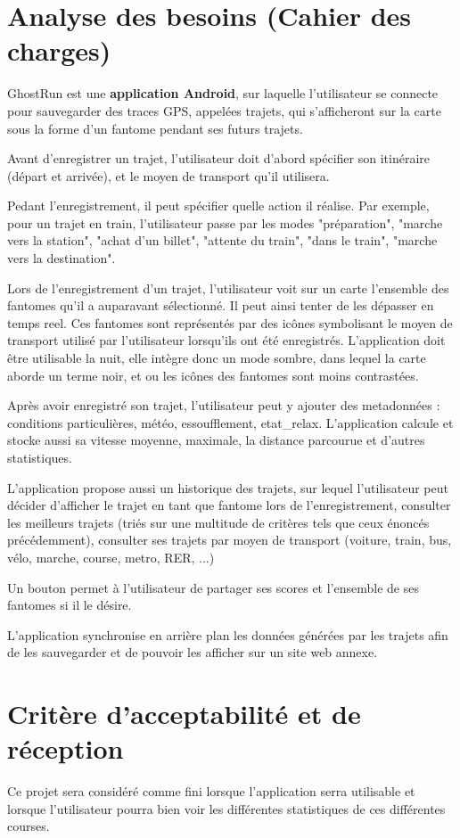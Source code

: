 \chapter{Analyse des besoins (Cahier des charges)}

GhostRun est une \textbf{application Android}, sur laquelle l'utilisateur se connecte pour sauvegarder des traces GPS, appelées trajets, qui s'afficheront sur la carte sous la forme d'un \gls{fantome} pendant ses futurs trajets.

Avant d'enregistrer un trajet, l'utilisateur doit d'abord spécifier son itinéraire (départ et arrivée), et le moyen de transport qu'il utilisera. 

Pedant l'enregistrement, il peut spécifier quelle action il réalise. Par exemple, pour un trajet en train, l'utilisateur passe par les modes "préparation", "marche vers la station", "achat d'un billet", "attente du train", "dans le train", "marche vers la destination".

Lors de l'enregistrement d'un trajet, l'utilisateur voit sur un carte l'ensemble des \glspl{fantome} qu'il a auparavant sélectionné. Il peut ainsi tenter de les dépasser en temps reel. Ces \glspl{fantome} sont représentés par des icônes symbolisant le moyen de transport utilisé par l'utilisateur lorsqu'ils ont été enregistrés. L'application doit être utilisable la nuit, elle intègre donc un mode sombre, dans lequel la carte aborde un terme noir, et ou les icônes des \glspl{fantome} sont moins contrastées.

Après avoir enregistré son trajet, l'utilisateur peut y ajouter des metadonnées : conditions particulières, météo, essoufflement, \gls{etat_relax}. L'application calcule et stocke aussi sa vitesse moyenne, maximale, la distance parcourue et d'autres statistiques.

L'application propose aussi un historique des trajets, sur lequel l'utilisateur peut décider d'afficher le trajet en tant que \gls{fantome} lors de l'enregistrement, consulter les meilleurs trajets (triés sur une multitude de critères tels que ceux énoncés précédemment), consulter ses trajets par moyen de transport (voiture, train, bus, vélo, marche, course, metro, RER, ...)

Un bouton permet à l'utilisateur de partager ses scores et l'ensemble de ses \glspl{fantome} si il le désire.

L'application synchronise en arrière plan les données générées par les trajets afin de les sauvegarder et de pouvoir les afficher sur un site web annexe.

\chapter{Critère d’acceptabilité et de réception }

Ce projet sera considéré comme fini lorsque l’application serra utilisable et lorsque l’utilisateur pourra bien voir les différentes statistiques de ces différentes courses.